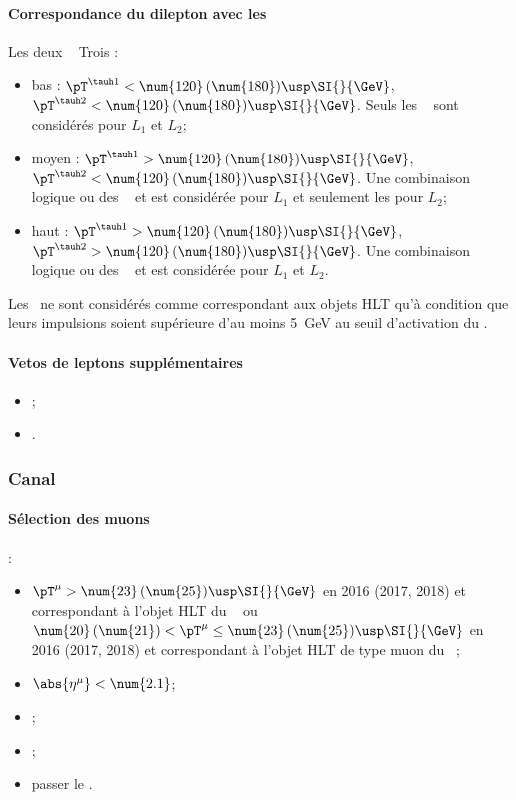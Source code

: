 \paragraph{Correspondance du dilepton avec les \HLTpaths}
Les deux \tauh\ \FromPairMatchToHLTObjects{}
Trois \HLTregionsDefined:
\begin{itemize}
    \item bas \pT: $\pT^{\tauh 1} < \num{120} \, (\num{180}) \usp \SI{}{\GeV}$, $\pT^{\tauh 2} < \num{120} \, (\num{180}) \usp \SI{}{\GeV}$.
        Seuls les \HLTpaths\ \HLTDoubleTau{} sont considérés pour $L_1$ et $L_2$;
    \item moyen \pT: $\pT^{\tauh 1} > \num{120} \, (\num{180}) \usp \SI{}{\GeV}$, $\pT^{\tauh 2} < \num{120} \, (\num{180}) \usp \SI{}{\GeV}$.
        Une combinaison logique \og ou \fg{} des \HLTpaths\ \HLTSingleTau{} et \HLTDoubleTau{} est considérée pour $L_1$ et seulement les \HLTDoubleTau{} pour $L_2$;
    \item haut \pT: $\pT^{\tauh 1} > \num{120} \, (\num{180}) \usp \SI{}{\GeV}$, $\pT^{\tauh 2} > \num{120} \, (\num{180}) \usp \SI{}{\GeV}$.
        Une combinaison logique \og ou \fg{} des \HLTpaths\ \HLTSingleTau{} et \HLTDoubleTau{} est considérée pour $L_1$ et $L_2$.
\end{itemize}
Les \tauh\ ne sont considérés comme correspondant aux objets HLT qu'à condition que leurs impulsions soient supérieure d'au moins \SI{5}{\GeV} au seuil d'activation du \HLTpath.
\paragraph{Vetos de leptons supplémentaires}
\LeptonVetoes
\begin{itemize}
    \item \LeptonVetoesExtraMuon;
    \item \LeptonVetoesExtraEle.
\end{itemize}

\subsubsection{Canal \mu\tauh}\label{chapter-HTT_analysis-section-offline-mt}
\paragraph{Sélection des muons}
:
\begin{itemize}
    \item $\pT^{\mu} > \num{23} \, (\num{25}) \usp \SI{}{\GeV}$ en 2016 (2017, 2018) et correspondant à l'objet HLT du \HLTpath\ \HLTSingleMu{} ou $\num{20} \, (\num{21}) < \pT^{\mu} \leq \num{23} \, (\num{25}) \usp \SI{}{\GeV}$ en 2016 (2017, 2018) et correspondant à l'objet HLT de type muon du \HLTpath\ \HLTMuTauCross{};
    \item $\abs{\eta^{\mu}} < \num{2.1}$;
    \item \Leptondzdxy;
    \item {};
    \item passer le \MediumMuonID.
\end{itemize}
